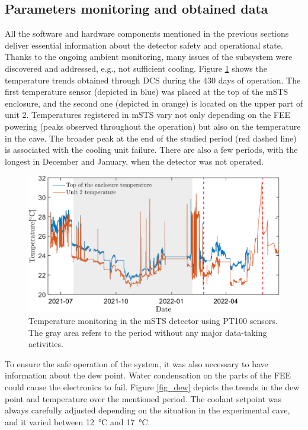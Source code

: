 \subsection{Parameters monitoring and obtained data}
All the software and hardware components mentioned in the previous sections deliver essential information about the detector safety and operational state. Thanks to the ongoing ambient monitoring, many issues of the subsystem were discovered and addressed, e.g., not sufficient cooling. Figure \ref{fig_temp} shows the temperature trends obtained through \gls{DCS} during the 430 days of operation. The first temperature sensor (depicted in blue) was placed at the top of the \gls{mSTS} enclosure, and the second one (depicted in orange) is located on the upper part of unit 2. Temperatures registered in \gls{mSTS} vary not only depending on the \gls{FEE} powering (peaks observed throughout the operation) but also on the temperature in the cave. The broader peak at the end of the studied period (red dashed line) is associated with the cooling unit failure. There are also a few periods, with the longest in December and January, when the detector was not operated. 

\begin{figure}[!h]
\centering
\includegraphics[width=0.9\columnwidth]{Chapter6/DCS/images/temp2.png}
\caption{Temperature monitoring in the \gls{mSTS} detector using PT100 sensors. The gray area refers to the period without any major data-taking activities.}
\label{fig_temp}
\end{figure}
\newpage
To ensure the safe operation of the system, it was also necessary to have information about the dew point. Water condensation on the parts of the \gls{FEE} could cause the electronics to fail. Figure \ref{fig_dew} depicts the trends in the dew point and temperature over the mentioned period. The coolant setpoint was always carefully adjusted depending on the situation in the experimental cave, and it varied between \SI{12}{\celsius} and \SI{17}{\celsius}.

